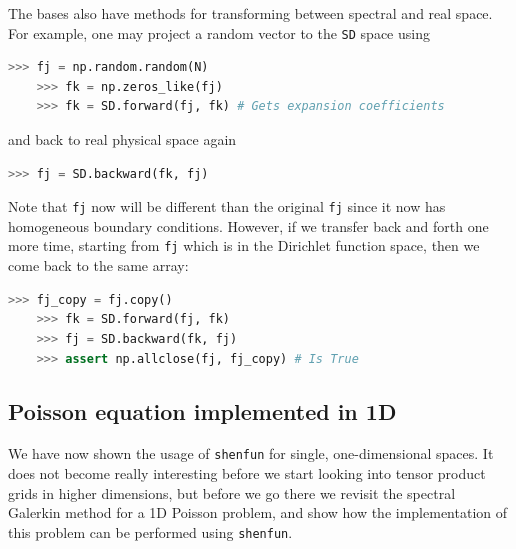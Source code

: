 \documentclass[%
oneside,                 %
final,                   %
10pt]{article}
\theoremstyle{definition}
\begin{document}
The bases also have methods for transforming between spectral and real space. For example, one may project a random vector to the \texttt{SD} space using
\begin{lstlisting}[language=Python,style=yellow2_fb]
    >>> fj = np.random.random(N)
    >>> fk = np.zeros_like(fj)
    >>> fk = SD.forward(fj, fk) # Gets expansion coefficients 
\end{lstlisting}
and back to real physical space again
\begin{lstlisting}[language=Python,style=yellow2_fb]
    >>> fj = SD.backward(fk, fj)
\end{lstlisting}
Note that \texttt{fj} now will be different than the original \texttt{fj} since it now has homogeneous boundary conditions. However, if we transfer back and forth one more time, starting from \texttt{fj} which is in the Dirichlet function space, then we come back to the same array:
\begin{lstlisting}[language=Python,style=yellow2_fb]
    >>> fj_copy = fj.copy()
    >>> fk = SD.forward(fj, fk)
    >>> fj = SD.backward(fk, fj)
    >>> assert np.allclose(fj, fj_copy) # Is True
\end{lstlisting}

\subsection{Poisson equation implemented in 1D}

We have now shown the usage of \texttt{shenfun} for single, one-dimensional spaces. It does not become really interesting before we start looking into tensor product grids in higher dimensions, but before we go there we revisit the spectral Galerkin method for a 1D Poisson problem, and show how the implementation of this problem can be performed using \texttt{shenfun}.
\end{document}
